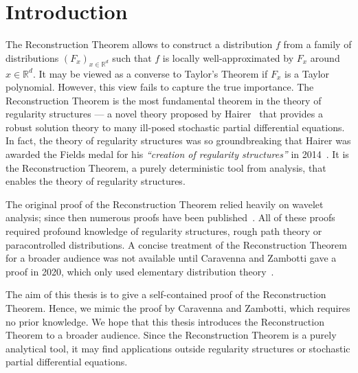 \chapter{Introduction} 

The Reconstruction Theorem allows to construct a distribution \(f\) from a family of distributions \({(F_{x})}_{x \in \mathbb{R}^d}\) such that \(f\) is locally well-approximated by \(F_x\) around \(x \in \mathbb{R}^d\). It may be viewed as a converse to Taylor's Theorem if \(F_x\) is a Taylor polynomial. However, this view fails to capture the true importance. The Reconstruction Theorem is the most fundamental theorem in the theory of regularity structures --- a novel theory proposed by Hairer~\cite{hairer2014theory} that provides a robust solution theory to many ill-posed stochastic partial differential equations. In fact, the theory of regularity structures was so groundbreaking that Hairer was awarded the Fields medal for his \emph{``creation of regularity structures''} in 2014~\cite{FieldsMedalHairer}. It is the Reconstruction Theorem, a purely deterministic tool from analysis, that enables the theory of regularity structures.

The original proof of the Reconstruction Theorem relied heavily on wavelet analysis; since then numerous proofs have been published~\cite{hairer2017reconstruction, otto2019quasilinear, gubinelli2015paracontrolled, martin2020littlewood, singh2018elementary}. All of these proofs required profound knowledge of regularity structures, rough path theory or paracontrolled distributions. A concise treatment of the Reconstruction Theorem for a broader audience was not available until Caravenna and Zambotti gave a proof in 2020, which only used elementary distribution theory~\cite{caravenna2021hairer}. 

The aim of this thesis is to give a self-contained proof of the Reconstruction Theorem. Hence, we mimic the proof by Caravenna and Zambotti, which requires no prior knowledge. We hope that this thesis introduces the Reconstruction Theorem to a broader audience. Since the Reconstruction Theorem is a purely analytical tool, it may find applications outside regularity structures or stochastic partial differential equations.

